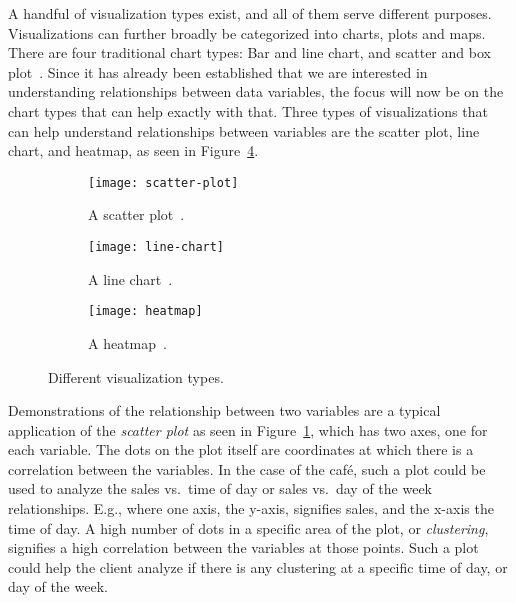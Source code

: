 A handful of visualization types exist, and all of them serve different purposes.
Visualizations can further broadly be categorized into charts, plots and maps.
There are four traditional chart types: Bar and line chart, and scatter and box plot~\cite{atlassianChartTypes}.
Since it has already been established that we are interested in understanding relationships between data variables,
the focus will now be on  the chart types that can help exactly with that.
Three types of visualizations that can help understand relationships between variables are the scatter plot, line
chart, and heatmap, as seen in Figure~\ref{fig:visualization-types}.

\begin{figure}[H]
    \centering
    \begin{subfigure}{.3\textwidth}
        \centering
        \texttt{[image: scatter-plot]}
        \caption{A scatter plot~\cite{atlassianChartTypes}.
        }\label{subfig:scatter-plot}
    \end{subfigure}
    \begin{subfigure}{.3\textwidth}
        \centering
        \texttt{[image: line-chart]}
        \caption{A line chart~\cite{atlassianChartTypes}.
        }\label{subfig:line-chart}
    \end{subfigure}
    \begin{subfigure}{.3\textwidth}
        \centering
        \texttt{[image: heatmap]}
        \caption{A heatmap~\cite{atlassianHeatmaps}.
        }\label{subfig:heatmap}
    \end{subfigure}
    \caption{Different visualization types.
    }\label{fig:visualization-types}
\end{figure}

Demonstrations of the relationship between two variables are a typical application of the \textit{scatter plot}
as seen in Figure~\ref{subfig:scatter-plot}, which has two axes, one for each variable.
The dots on the plot itself are coordinates at which there is a correlation between the variables.
In the case of the café, such a plot could be used to analyze the sales vs.\ time of day or sales vs.\ day of the week
relationships.
E.g., where one axis, the y-axis, signifies sales, and the x-axis the time of day.
A high number of dots in a specific area of the plot, or \textit{clustering}, signifies a high correlation between the
variables at those points.
Such a plot could help the client analyze if there is any clustering at a specific time of day, or day of the week.

